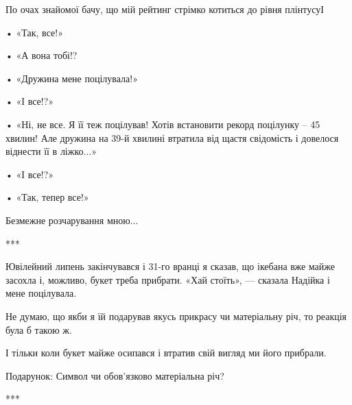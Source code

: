 По очах знайомої бачу, що мій рейтинг стрімко котиться до рівня плінтусуІ 

• «Так, все!»

• «А вона тобі!?

• «Дружина мене поцілувала!»

• «І все!?»

• «Ні, не все. Я її теж поцілував! Хотів встановити рекорд поцілунку – 45
хвилин! Але дружина на 39-й хвилині втратила від щастя свідомість і довелося
віднести її в ліжко...»

• «І все!?»

• «Так, тепер все!»

Безмежне розчарування мною...

***

Ювілейний липень закінчувався і 31-го вранці я сказав, що ікебана вже майже
засохла і, можливо, букет треба прибрати. «Хай стоїть», — сказала Надійка і
мене поцілувала.

Не думаю, що якби я їй подарував якусь прикрасу чи матеріальну річ, то реакція
була б такою ж. 

І тільки коли букет майже осипався і втратив свій вигляд ми його прибрали.

Подарунок: Символ чи обов’язково матеріальна річ? 

***

